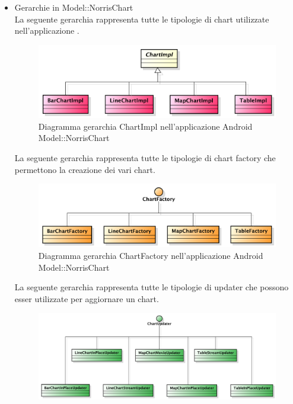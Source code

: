             \begin{itemize}
                \item Gerarchie in Model::NorrisChart \\
                    La seguente gerarchia rappresenta tutte le tipologie di chart utilizzate nell'applicazione .
                    \begin{figure}[H]
                        \centering
                        \includegraphics[width=1\textwidth]{DefinizioneDiProdotto/Pics/Gerarchie/ModelChartImpl.pdf}
                        \caption{Diagramma gerarchia ChartImpl nell'applicazione Android Model::NorrisChart }
                    \end{figure}
                    La seguente gerarchia rappresenta tutte le tipologie di chart factory che permettono la creazione dei vari chart.
                    \begin{figure}[H]
                        \centering
                        \includegraphics[width=1\textwidth]{DefinizioneDiProdotto/Pics/Gerarchie/ModelFactory.pdf}
                        \caption{Diagramma gerarchia ChartFactory nell'applicazione Android Model::NorrisChart}
                    \end{figure}
                    La seguente gerarchia rappresenta tutte le tipologie di updater che possono esser utilizzate per aggiornare un chart.
                    \begin{figure}[H]
                        \centering
                        \includegraphics[width=1\textwidth]{DefinizioneDiProdotto/Pics/Gerarchie/ModelUpdater.pdf}

\end{figure}
\end{itemize}
